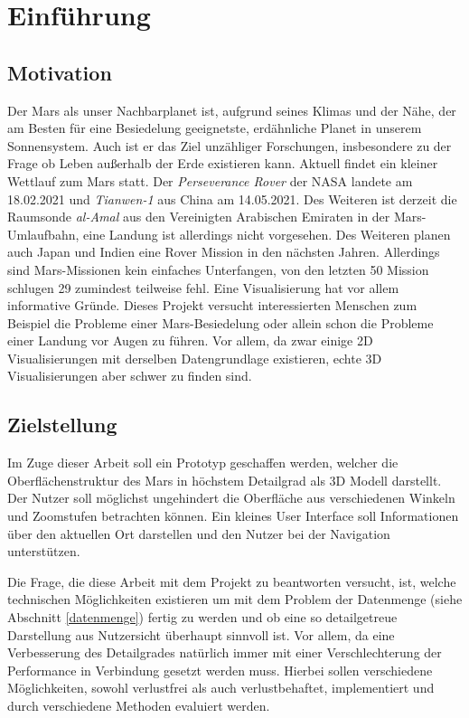 \chapter{Einführung}

\section{Motivation}
Der Mars als unser Nachbarplanet ist, aufgrund seines Klimas und der Nähe, der am Besten für eine Besiedelung geeignetste, erdähnliche Planet in unserem Sonnensystem. Auch ist er das Ziel unzähliger Forschungen, insbesondere zu der Frage ob Leben außerhalb der Erde existieren kann. Aktuell findet ein kleiner Wettlauf zum Mars statt. Der \textit{Perseverance Rover} der NASA landete am 18.02.2021 und \textit{Tianwen-1} aus China am 14.05.2021. Des Weiteren ist derzeit die Raumsonde \textit{al-Amal} aus den Vereinigten Arabischen Emiraten in der Mars-Umlaufbahn, eine Landung ist allerdings nicht vorgesehen. Des Weiteren planen auch Japan und Indien eine Rover Mission in den nächsten Jahren. Allerdings sind Mars-Missionen kein einfaches Unterfangen, von den letzten 50 Mission schlugen 29 zumindest teilweise fehl\cite{marsMissions}. Eine Visualisierung hat vor allem informative Gründe. Dieses Projekt versucht interessierten Menschen zum Beispiel die Probleme einer Mars-Besiedelung oder allein schon die Probleme einer Landung vor Augen zu führen. Vor allem, da zwar einige 2D Visualisierungen mit derselben Datengrundlage existieren, echte 3D Visualisierungen aber schwer zu finden sind.

\section{Zielstellung}
Im Zuge dieser Arbeit soll ein Prototyp geschaffen werden, welcher die Oberflächenstruktur des Mars in höchstem Detailgrad als 3D Modell darstellt. Der Nutzer soll möglichst ungehindert die Oberfläche aus verschiedenen Winkeln und Zoomstufen betrachten können. Ein kleines User Interface soll Informationen über den aktuellen Ort darstellen und den Nutzer bei der Navigation unterstützen.

Die Frage, die diese Arbeit mit dem Projekt zu beantworten versucht, ist, welche technischen Möglichkeiten existieren um mit dem Problem der Datenmenge (siehe Abschnitt \ref{datenmenge}) fertig zu werden und ob eine so detailgetreue Darstellung aus Nutzersicht überhaupt sinnvoll ist. Vor allem, da eine Verbesserung des Detailgrades natürlich immer mit einer Verschlechterung der Performance in Verbindung gesetzt werden muss. Hierbei sollen verschiedene Möglichkeiten, sowohl verlustfrei als auch verlustbehaftet, implementiert und durch verschiedene Methoden evaluiert werden.

